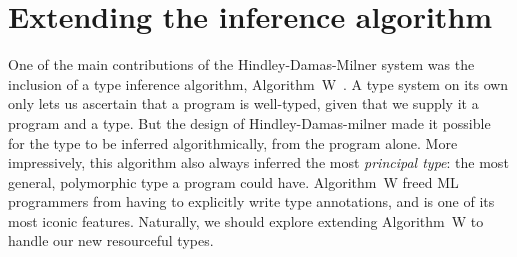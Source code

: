 \section{Extending the inference algorithm}
One of the main contributions of the Hindley-Damas-Milner system was
the inclusion of a type inference algorithm,
Algorithm~W~\cite{milner1978}. A type system on its own only lets us
ascertain that a program is well-typed, given that we supply it a
program and a type. But the design of Hindley-Damas-milner made it
possible for the type to be inferred algorithmically, from the program
alone. More impressively, this algorithm also always inferred the most
\emph{principal type}: the most general, polymorphic type a program
could have.  Algorithm~W freed ML programmers from having to
explicitly write type annotations, and is one of its most iconic
features. Naturally, we should explore extending Algorithm~W to handle
our new resourceful types.


